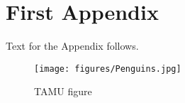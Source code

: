 


\chapter{First Appendix}\label{appendix:01}

Text for the Appendix follows.

\begin{figure}[h]
\centering
\texttt{[image: figures/Penguins.jpg]}
\caption{TAMU figure}
\label{fig:tamu-fig5}
\end{figure}
